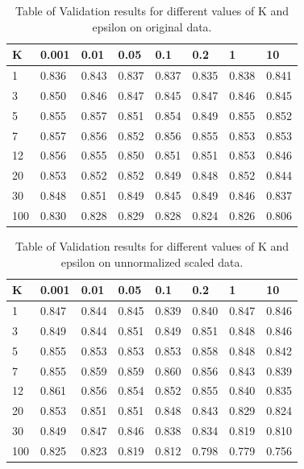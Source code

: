 \documentclass[letterpaper]{article}
\begin{document}
\begin{table}[h!]
\centering
\begin{tabular}{l|lllllll}
K   & 0.001 & 0.01  & 0.05  & 0.1   & 0.2   & 1     & 10\\\hline\hline %
1   & 0.836 & 0.843 & 0.837 & 0.837 & 0.835 & 0.838 & 0.841 \\
3   & 0.850 & 0.846 & 0.847 & 0.845 & 0.847 & 0.846 & 0.845 \\
5   & 0.855 & 0.857 & 0.851 & 0.854 & 0.849 & 0.855 & 0.852 \\
7   & 0.857 & 0.856 & 0.852 & 0.856 & 0.855 & 0.853 & 0.853 \\
12  & 0.856 & 0.855 & 0.850 & 0.851 & 0.851 & 0.853 & 0.846 \\
20  & 0.853 & 0.852 & 0.852 & 0.849 & 0.848 & 0.852 & 0.844 \\
30  & 0.848 & 0.851 & 0.849 & 0.845 & 0.849 & 0.846 & 0.837 \\
100 & 0.830 & 0.828 & 0.829 & 0.828 & 0.824 & 0.826 & 0.806
\end{tabular}
\caption{Table of Validation results for different values of K and epsilon on original data.}
\label{tab:cross_validation_original}
\end{table}



\begin{table}[h!]
\centering

\begin{tabular}{l|lllllll}
K   & 0.001 & 0.01  & 0.05  & 0.1   & 0.2   & 1     & 10\\\hline\hline %
1   & 0.847 & 0.844 & 0.845 & 0.839 & 0.840 & 0.847 & 0.846 \\
3   & 0.849 & 0.844 & 0.851 & 0.849 & 0.851 & 0.848 & 0.846 \\
5   & 0.855 & 0.853 & 0.853 & 0.853 & 0.858 & 0.848 & 0.842 \\
7   & 0.855 & 0.859 & 0.859 & 0.860 & 0.856 & 0.843 & 0.839 \\
12  & 0.861 & 0.856 & 0.854 & 0.852 & 0.855 & 0.840 & 0.835 \\
20  & 0.853 & 0.851 & 0.851 & 0.848 & 0.843 & 0.829 & 0.824 \\
30  & 0.849 & 0.847 & 0.846 & 0.838 & 0.834 & 0.819 & 0.810 \\
100 & 0.825 & 0.823 & 0.819 & 0.812 & 0.798 & 0.779 & 0.756
\end{tabular}
\caption{Table of Validation results for different values of K and epsilon on unnormalized scaled data.}
\label{tab:cross_validation_scaled}

\end{table}
\end{document}
